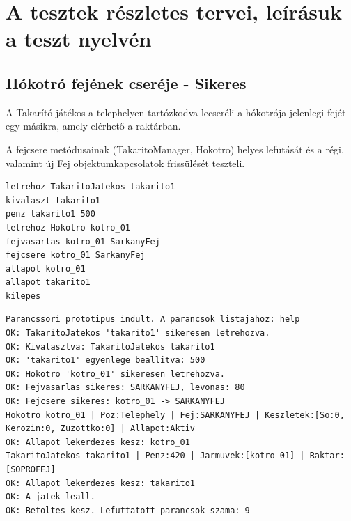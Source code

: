 \section{A tesztek részletes tervei, leírásuk a teszt nyelvén}

\subsection{Hókotró fejének cseréje - Sikeres}
\begin{test-case-description}
    A Takarító játékos a telephelyen tartózkodva lecseréli a hókotrója jelenlegi fejét egy másikra, amely elérhető a raktárban.
\end{test-case-description}
\begin{test-case-function}
    A fejcsere metódusainak (TakaritoManager, Hokotro) helyes lefutását és a régi, valamint új Fej objektumkapcsolatok frissülését teszteli.
\end{test-case-function}
\begin{test-case-input}
\begin{verbatim}
letrehoz TakaritoJatekos takarito1
kivalaszt takarito1
penz takarito1 500
letrehoz Hokotro kotro_01
fejvasarlas kotro_01 SarkanyFej
fejcsere kotro_01 SarkanyFej
allapot kotro_01
allapot takarito1
kilepes
\end{verbatim}
\end{test-case-input}
\begin{test-case-output}
\begin{verbatim}
Parancssori prototipus indult. A parancsok listajahoz: help
OK: TakaritoJatekos 'takarito1' sikeresen letrehozva.
OK: Kivalasztva: TakaritoJatekos takarito1
OK: 'takarito1' egyenlege beallitva: 500
OK: Hokotro 'kotro_01' sikeresen letrehozva.
OK: Fejvasarlas sikeres: SARKANYFEJ, levonas: 80
OK: Fejcsere sikeres: kotro_01 -> SARKANYFEJ
Hokotro kotro_01 | Poz:Telephely | Fej:SARKANYFEJ | Keszletek:[So:0, Kerozin:0, Zuzottko:0] | Allapot:Aktiv
OK: Allapot lekerdezes kesz: kotro_01
TakaritoJatekos takarito1 | Penz:420 | Jarmuvek:[kotro_01] | Raktar:[SOPROFEJ]
OK: Allapot lekerdezes kesz: takarito1
OK: A jatek leall.
OK: Betoltes kesz. Lefuttatott parancsok szama: 9
\end{verbatim}
\end{test-case-output}

